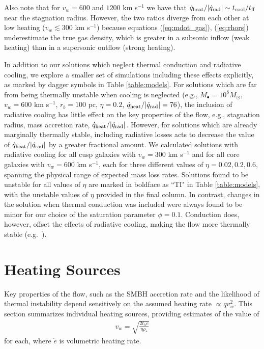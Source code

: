 \documentclass[usenatbib,fleqn]{mn2e}
\newcommand{\rhostar}{\rho_*}
\begin{document}
Also note that for $v_{w}=600$ and $1200$ km s$^{-1}$ we have that
$\dot{q}_{\rm heat}/|\dot{q}_{\rm rad}| \sim t_{\rm cool}/t_{\rm ff}$
near the stagnation radius.  However, the two ratios diverge from each
other at low heating ($v_{w} \lesssim 300$ km s$^{-1}$) because
equations (\ref{eq:mdot_gas}), (\ref{eq:rhors}) underestimate the true
gas density, which is greater in a subsonic inflow (weak heating) than
in a supersonic outflow (strong heating).

In addition to our solutions which neglect thermal conduction and radiative cooling, we explore a smaller set of simulations including these effects explicitly, as marked by dagger symbols in Table \ref{table:models}.  For solutions which are far from being thermally unstable when cooling is neglected (e.g., $M_{\bullet} = 10^{8}M_{\odot}$, $v_{w} = 600$ km s$^{-1}$, $r_{b} = 100$ pc, $\eta = 0.2$, $\dot{q}_{\rm heat}/|\dot{q}_{\rm rad}| = 76$), the inclusion of radiative cooling has little effect on the key properties of the flow, e.g., stagnation radius, mass accretion rate, $\dot{q}_{\rm heat}/|\dot{q}_{\rm rad}|$.  However, for solutions which are already marginally thermally stable, including radiative losses acts to decrease the value of $\dot{q}_{\rm heat}/|\dot{q}_{\rm rad}|$ by a greater fractional amount.  We calculated solutions with radiative cooling for all cusp galaxies with $v_w=300$ km s$^{-1}$ and for all core galaxies with $v_w=600 $ km s$^{-1}$, each for three different values of $\eta = 0.02, 0.2, 0.6$, spanning the physical range of expected mass loss rates.  Solutions found to be unstable for all values of $\eta$ are marked in boldface as ``TI" in Table \ref{table:models}, with the unstable values of $\eta$ provided in the final column.  In contrast, changes in the solution when thermal conduction was included were always found to be minor for our choice of the saturation parameter $\phi = 0.1$.  Conduction does, however, offset the effects of radiative cooling, making the flow more thermally stable (e.g.~\citealt{Zakamska&Narayan03}).  

\section{Heating Sources}
\label{sec:heating}

Key properties of the flow, such as the SMBH accretion rate and the likelihood of thermal instability depend sensitively on the assumed heating rate $\propto qv_{w}^{2}$.  This section summarizes individual heating sources, providing estimates of the value of
\begin{align}
  v_{w} = \sqrt{\frac{2 t_h \dot{e}}{\eta \rhostar}}
  \label{eq:vw_eff}
\end{align}
for each, where $\dot{e}$ is volumetric heating rate.  
\end{document}
